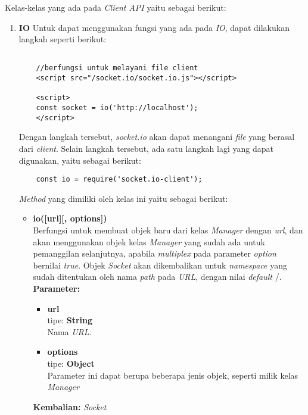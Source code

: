 Kelas-kelas yang ada pada \textit{Client API} yaitu sebagai berikut:
\begin{enumerate}
	\item \textbf{IO}
	Untuk dapat menggunakan fungsi yang ada pada \textit{IO}, dapat dilakukan langkah seperti berikut:
	\begin{lstlisting}
	
	//berfungsi untuk melayani file client
	<script src="/socket.io/socket.io.js"></script>
	
	<script>
	const socket = io('http://localhost');
	</script>
	\end{lstlisting}
	Dengan langkah tersebut, \textit{socket.io} akan dapat menangani \textit{file} yang berasal dari \textit{client}. Selain langkah tersebut, ada satu langkah lagi yang dapat digunakan, yaitu sebagai berikut:
	\begin{lstlisting}
	const io = require('socket.io-client');
	\end{lstlisting}
	
	\textit{Method} yang dimiliki oleh kelas ini yaitu sebagai berikut:
	\begin{itemize}
		\item \textbf{io([url][, options])} \\
		Berfungsi untuk membuat objek baru dari kelas \textit{Manager} dengan \textit{url}, dan akan menggunakan objek kelas \textit{Manager} yang sudah ada untuk pemanggilan selanjutnya, apabila \textit{multiplex} pada parameter \textit{option} bernilai \textit{true}. Objek \textit{Socket} akan dikembalikan untuk \textit{namespace} yang sudah ditentukan oleh nama \textit{path} pada \textit{URL}, dengan nilai \textit{default} /. \\
		\textbf{Parameter:}
		\begin{itemize}
			\item \textbf{url} \\tipe: \textbf{String} \\ Nama \textit{URL}.
			\item \textbf{options} \\tipe: \textbf{Object} \\ Parameter ini dapat berupa beberapa jenis objek, seperti milik kelas \textit{Manager}
		\end{itemize}
		\textbf{Kembalian:} \textit{Socket}
		
	\end{itemize}
	

\end{enumerate}
